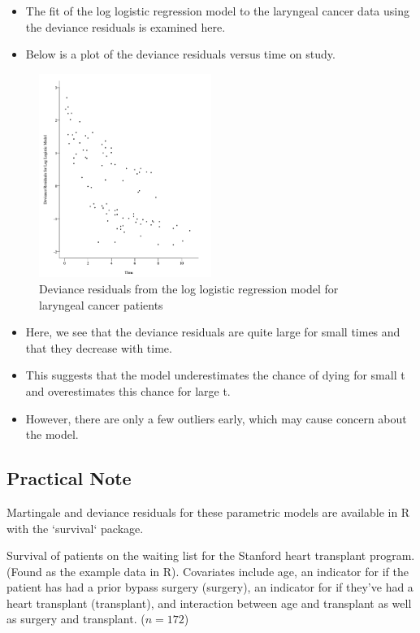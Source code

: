 \documentclass[10pt]{article}\usepackage[]{graphicx}\usepackage[]{xcolor}
\theoremstyle{definition}
\numberwithin{equation}{subsection}
\numberwithin{figure}{section}
\numberwithin{table}{subsection}
\numberwithin{Report}{section}
\numberwithin{Example}{subsection}
\begin{document}
\begin{itemize}
	\item The fit of the log logistic regression model to the laryngeal cancer data using the deviance residuals is examined here.
	\item Below is a plot of the deviance residuals versus time on study.
\end{itemize}
\begin{figure}[h!]
	\centering
  \includegraphics[width=0.5\textwidth]{figures/martingale}
  \caption{Deviance residuals from the log logistic regression model for laryngeal cancer patients}
\end{figure}
\begin{itemize}
	\item Here, we see that the deviance residuals are quite large for small times and that they decrease with time.
	\item This suggests that the model underestimates the chance of dying for small t and overestimates this chance for large t.
	\item However, there are only a few outliers early, which may cause concern about the model. 
\end{itemize}

\subsection{Practical Note}
Martingale and deviance residuals for these parametric models are available in R with the `survival` package.


Survival of patients on the waiting list for the Stanford heart transplant program. (Found as the example data in R). Covariates include age, an indicator for if the patient has had a prior bypass surgery (surgery), an indicator for if they've had a heart transplant (transplant), and interaction between age and transplant as well as surgery and transplant. ($n = 172$) 
\end{document}
